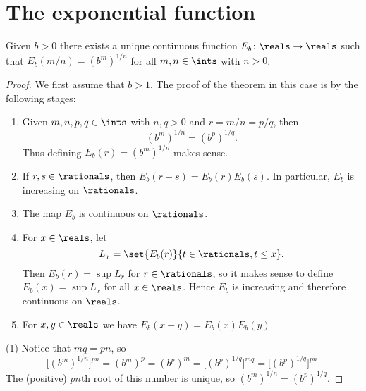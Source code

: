 \documentclass[article, a4paper, 11pt, oneside]{memoir}
\title{\doctitle}
\author{\docauthor}
\numberwithin{equation}{chapter}
\begin{document}
\maketitle

\chapter{The exponential function}

\begin{theorem}
    Given $b > 0$ there exists a unique continuous function $E_b \colon \reals \to \reals$ such that $E_b(m/n) = (b^m)^{1/n}$ for all $m,n \in \ints$ with $n > 0$.
\end{theorem}

\begin{proof}
    We first assume that $b > 1$. The proof of the theorem in this case is by the following stages:
    \begin{enumerate}
        \item Given $m,n,p,q \in \ints$ with $n,q > 0$ and $r = m/n = p/q$, then
        \begin{equation*}
            (b^m)^{1/n}
                = (b^p)^{1/q}.
        \end{equation*}
        Thus defining $E_b(r) = (b^m)^{1/n}$ makes sense.

        \item If $r,s \in \rationals$, then $E_b(r+s) = E_b(r) E_b(s)$. In particular, $E_b$ is increasing on $\rationals$.
        
        \item The map $E_b$ is continuous on $\rationals$.
        
        \item For $x \in \reals$, let
        \begin{equation*}
            L_x
                = \set{E_b(r)}{t \in \rationals, t \leq x}.
        \end{equation*}
        Then $E_b(r) = \sup L_r$ for $r \in \rationals$, so it makes sense to define $E_b(x) = \sup L_x$ for all $x \in \reals$. Hence $E_b$ is increasing and therefore continuous on $\reals$.

        \item For $x,y \in \reals$ we have $E_b(x+y) = E_b(x) E_b(y)$.
    \end{enumerate}
    (1) Notice that $mq = pn$, so
    \begin{equation*}
        \bigl[ (b^m)^{1/n} \bigr]^{pn}
            = (b^m)^p
            = (b^p)^m
            = \bigl[ (b^p)^{1/q} \bigr]^{mq}
            = \bigl[ (b^p)^{1/q} \bigr]^{pn}.
    \end{equation*}
    The (positive) $pn$th root of this number is unique, so $(b^m)^{1/n} = (b^p)^{1/q}$.


\end{proof}
\end{document}
